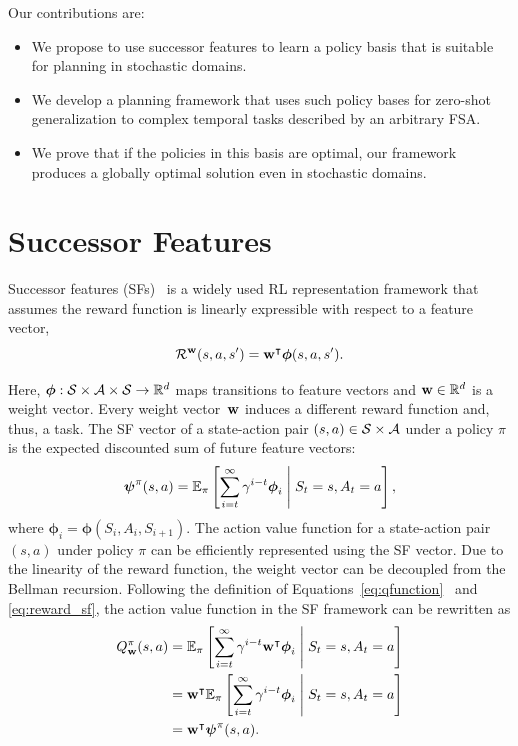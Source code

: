 Our contributions are:
 \begin{itemize}
    \item We propose to use successor features to learn a policy basis that is suitable for planning in stochastic domains.
    \item We develop a planning framework that uses such policy bases for zero-shot generalization to complex temporal tasks described by an arbitrary FSA.
    \item We prove that if the policies in this basis are optimal, our framework produces a globally optimal solution even in stochastic domains.
\end{itemize}



\section{Successor Features}

Successor features (SFs)~\citep{Dayan1993, Barreto2017} is a widely used RL representation framework that assumes the reward function is linearly expressible with respect to a feature vector,
\begin{equation}
  \mathcal{R}^{\mathbf{w}}(s, a, s') = \mathbf{w}^\intercal\boldsymbol\phi(s, a , s').
  \label{eq:reward_sf}
\end{equation}

Here, $\boldsymbol\phi:\mathcal{S}\times\mathcal{A}\times\mathcal{S}\rightarrow\mathbb{R}^{d}$ maps transitions to feature vectors and $\mathbf{w}\in\mathbb{R}^d$ is a weight vector. Every weight vector~$\mathbf{w}$ induces a different reward function and, thus, a task. The SF vector of a state-action pair $(s,a)\in\mathcal{S}\times\mathcal{A}$ under a policy $\pi$ is the expected discounted sum of future feature vectors: 
\begin{equation}
  \boldsymbol{\mathbf{\psi}}^\pi(s, a) = \mathbb{E}_{\pi}\left[\sum_{i=t}^\infty \gamma^{i-t} \boldsymbol\phi_i\;\middle\lvert\;S_t = s, A_t = a\right],
  \label{eq:sf}
\end{equation}
where $\boldsymbol\phi_i = \boldsymbol\phi(S_{i}, A_{i}, S_{i+1})$. The action value function for a state-action pair $(s, a)$ under policy $\pi$ can be efficiently represented using the SF vector. Due to the linearity of the reward function, the weight vector can be decoupled from the Bellman recursion. Following the definition of Equations~\eqref{eq:qfunction}~ and \eqref{eq:reward_sf}, the action value function in the SF framework can be rewritten as
\begin{align}
  Q^\pi_{\mathbf{w}}(s, a) &= \mathbb{E}_{\pi}\left[\sum_{i=t} ^\infty \gamma^{i-t} \mathbf{w}^\intercal\boldsymbol\phi_i\;\middle\lvert\;S_t = s, A_t = a\right] \nonumber \\
                 & = \mathbf{w}^\intercal\mathbb{E}_{\pi}\left[\sum_{i=t} ^\infty \gamma^{i-t} \boldsymbol\phi_i\;\middle\lvert\;S_t = s, A_t = a\right] \nonumber \\
                 &=  \mathbf{w}^\intercal \boldsymbol{\mathbf{\psi}}^\pi(s, a) .
\label{eq:qfunction_sf}
\end{align}

